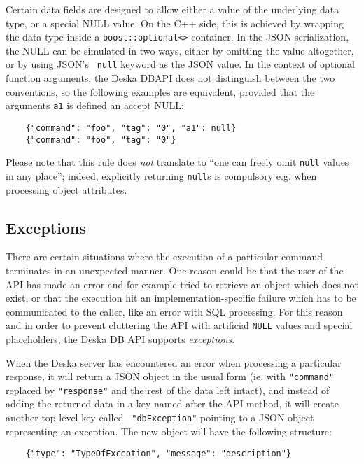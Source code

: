\documentclass[deska]{subfiles}
\begin{document}
Certain data fields are designed to allow either a value of the underlying data type, or a special NULL value.  On the
C++ side, this is achieved by wrapping the data type inside a {\tt boost::optional<>} container.  In the JSON
serialization, the NULL can be simulated in two ways, either by omitting the value altogether, or by using JSON's {\tt
null} keyword as the JSON value.  In the context of optional function arguments, the Deska DBAPI does not distinguish
between the two conventions, so the following examples are equivalent, provided that the arguments {\tt a1} is defined
an accept NULL:

\begin{verbatim}
    {"command": "foo", "tag": "0", "a1": null}
    {"command": "foo", "tag": "0"}
\end{verbatim}

Please note that this rule does {\em not} translate to ``one can freely omit {\tt null} values in any place''; indeed,
explicitly returning {\tt null}s is compulsory e.g. when processing object attributes.

\subsection{Exceptions}

There are certain situations where the execution of a particular command terminates in an unexpected manner.  One reason
could be that the user of the API has made an error and for example tried to retrieve an object which does not exist, or
that the execution hit an implementation-specific failure which has to be communicated to the caller, like an error with
SQL processing.  For this reason and in order to prevent cluttering the API with artificial {\tt NULL} values and
special placeholders, the Deska DB API supports {\em exceptions}.

When the Deska server has encountered an error when processing a particular response, it will return a JSON object in
the usual form (ie. with {\tt "command"} replaced by {\tt "response"} and the rest of the data left intact), and instead
of adding the returned data in a key named after the API method, it will create another top-level key called {\tt
"dbException"} pointing to a JSON object representing an exception.  The new object will have the following structure:

\begin{verbatim}
    {"type": "TypeOfException", "message": "description"}
\end{verbatim}
\end{document}

